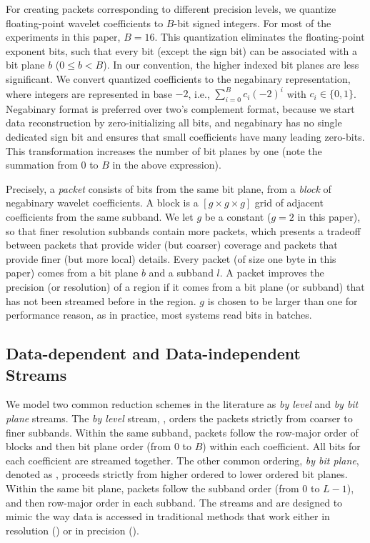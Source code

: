 For creating packets corresponding to different precision levels, we quantize floating-point wavelet
coefficients to $B$-bit signed integers. For most of the experiments in this paper, $B=16$. This
quantization eliminates the floating-point exponent bits, such that every bit (except the sign bit)
can be associated with a bit plane $b$ ($0\leq b < B$). In our convention, the higher indexed bit 
planes are less significant. We convert quantized coefficients to the negabinary representation, where integers are represented in base $-2$, i.e., $\sum_{i=0}^{B}{c_i(-2)^i}$ with $c_i\in \{0,1\}$. 
Negabinary format is preferred over two's complement format, because we start data reconstruction by 
zero-initializing all bits, and negabinary has no single dedicated sign bit and ensures that small coefficients have many leading zero-bits.
%
This transformation increases the number of bit planes by one (note the summation from $0$ to $B$ in
the above expression).

Precisely, a \emph{packet} consists of bits from the same bit plane, from a \emph{block} of
negabinary wavelet coefficients. A block is a $[g\times g\times g]$ grid of adjacent coefficients
from the same subband. We let $g$ be a constant ($g=2$ in this paper), so that finer resolution
subbands contain more packets, which presents a tradeoff between packets that provide wider (but
coarser) coverage and packets that provide finer (but more local) details. Every packet (of size one
byte in this paper) comes from a bit plane $b$ and a subband $l$. A packet improves the precision
(or resolution) of a region if it comes from a bit plane (or subband) that has not been streamed
before in the region. $g$ is chosen to be larger than one for performance reason, as in practice,
most systems read bits in batches.

\subsection{Data-dependent and Data-independent Streams} \label{sec:static-dynamic-streams}

We model two common reduction schemes in the literature as \emph{by level} and \emph{by bit plane}
streams. The \emph{by level} stream, \slvl, orders the packets strictly from coarser to finer
subbands. Within the same subband, packets follow the row-major order of blocks and then bit plane
order (from 0 to $B$) within each coefficient. All bits for each coefficient are streamed together.
The other common ordering, \emph{by bit plane}, denoted as \sbit, proceeds strictly from higher
ordered to lower ordered bit planes. Within the same bit plane, packets follow the subband order
(from $0$ to $L-1$), and then row-major order in each subband. The streams \slvl and \sbit are
designed to mimic the way data is accessed in traditional methods that work either in resolution
(\slvl) or in precision (\sbit).

